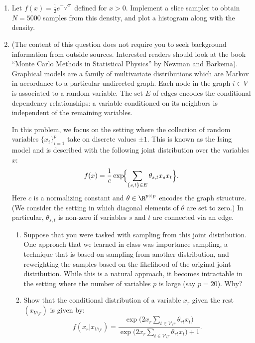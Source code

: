 \begin{enumerate}
\item[\textbf{5.3}] Let $f(x) = \frac{1}{2} e^{-\sqrt{x}}$ defined for $x > 0$. Implement a
  slice sampler to obtain $N = 5000$ samples from this density, and plot a histogram along with
  the density.

\item[\textbf{5.4}] (The content of this question does not require you to seek background
  information from outside sources. Interested readers should look at the book ``Monte Carlo
  Methods in Statistical Physics'' by Newman and Barkema). Graphical models are a family of
  multivariate distributions which are Markov in accordance to a particular undirected graph.
  Each node in the graph $i \in V$ is associated to a random variable. The set $E$ of edges
  encodes the conditional dependency relationships: a variable conditioned on its neighbors is
  independent of the remaining variables.

  In this problem, we focus on the setting where the collection of random variables
  $\{x_i\}_{i=1}^p$ take on discrete values $\pm 1$. This is known as the Ising model and is
  described with the following joint distribution over the variables $x$:
  \[
    f(x) = \frac{1}{c} \exp\!\Bigl\{\sum_{\{s,t\} \in E} \theta_{s,t} x_s x_t\Bigr\}.
  \]
  Here $c$ is a normalizing constant and $\theta \in \R^{p \times p}$ encodes the graph
  structure. (We consider the setting in which diagonal elements of $\theta$ are set to zero.)
  In particular, $\theta_{s,t}$ is non-zero if variables $s$ and $t$ are connected via an edge.

  \begin{enumerate}
    \item Suppose that you were tasked with sampling from this joint distribution. One approach
      that we learned in class was importance sampling, a technique that is based on sampling
      from another distribution, and reweighting the samples based on the likelihood of the
      original joint distribution. While this is a natural approach, it becomes intractable in
      the setting where the number of variables $p$ is large (say $p = 20$). Why?

    \item Show that the conditional distribution of a variable $x_r$ given the rest
      $(x_{V \setminus r})$ is given by:
      \[
        f(x_r | x_{V \setminus r})
        = \frac{\exp\!\bigl(2x_r \sum_{t \in V \setminus r} \theta_{rt} x_t\bigr)}
               {\exp\!\bigl(2x_r \sum_{t \in V \setminus r} \theta_{rt} x_t\bigr) + 1}.
      \]


\end{enumerate}
\end{enumerate}
